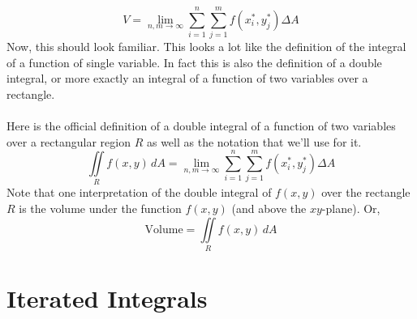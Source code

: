 \documentclass[10pt,reqno]{book}
\theoremstyle{definition}
\begin{document}
	\[ V = \lim_{n,m \to \infty} \sum_{i=1}^{n} \sum_{j=1}^{m} f(x_i^*,y_j^*) \Delta A \]
	Now, this should look familiar. This looks a lot like the definition of the integral of a function of single variable. In fact this is also the definition of a double integral, or more exactly an integral of a function of two variables over a rectangle.\\ \\
	Here is the official definition of a double integral of a function of two variables over a rectangular region $ R $ as well as the notation that we'll use for it.
	\[ \iint\limits_R f(x,y)\,dA = \lim_{n,m \to \infty} \sum_{i=1}^{n} \sum_{j=1}^{m} f(x_i^*,y_j^*) \Delta A \]
	Note that one interpretation of the double integral of $ f(x,y) $ over the rectangle $ R $ is the volume under the function $ f(x,y) $ (and above the $ xy $-plane).  Or,
	\[ \text{Volume} = \iint\limits_R f(x,y)\,dA \]
	
	\section{Iterated Integrals}
	
\end{document}

